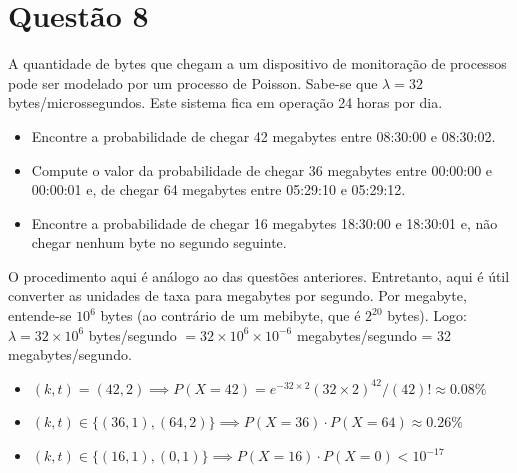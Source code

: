 \section{Questão 8}

A quantidade de bytes que chegam a um dispositivo de monitoração de processos pode ser modelado por um processo de Poisson.
Sabe-se que $\lambda = 32$ bytes/microssegundos. 
Este sistema fica em operação 24 horas por dia.
%
\begin{itemize}
    \item [a)] Encontre a probabilidade de chegar 42 megabytes entre 08:30:00 e 08:30:02.
    \item [b)] Compute o valor da probabilidade de chegar 36 megabytes entre 00:00:00 e 00:00:01 e, de chegar 64 megabytes entre 05:29:10 e 05:29:12.
    \item [c)] Encontre a probabilidade de chegar 16 megabytes 18:30:00 e 18:30:01 e, não chegar nenhum byte no segundo seguinte.
\end{itemize}

\begin{respostas}
    O procedimento aqui é análogo ao das questões anteriores.
    Entretanto, aqui é útil converter as unidades de taxa para megabytes por segundo.
    Por megabyte, entende-se $10^6$ bytes (ao contrário de um mebibyte, que é $2^{20}$ bytes).
    Logo: $\lambda = 32 \times 10^6$ bytes/segundo $= 32 \times 10^6 \times 10^{-6}$ megabytes/segundo = 32 megabytes/segundo.
\begin{itemize}
    \item [a)] $(k,t) = (42, 2) \implies P(X = 42) = e^{-32 \times 2} (32 \times 2)^{42}/(42)! \approx 0.08\%$
    \item [b)] $(k,t) \in \{(36, 1), (64, 2)\} \implies P(X = 36) \cdot P(X = 64) \approx 0.26\%$
    \item [c)] $(k,t) \in \{(16, 1), (0, 1)\} \implies P(X = 16) \cdot P(X = 0) < 10^{-17}$
\end{itemize}
\end{respostas}